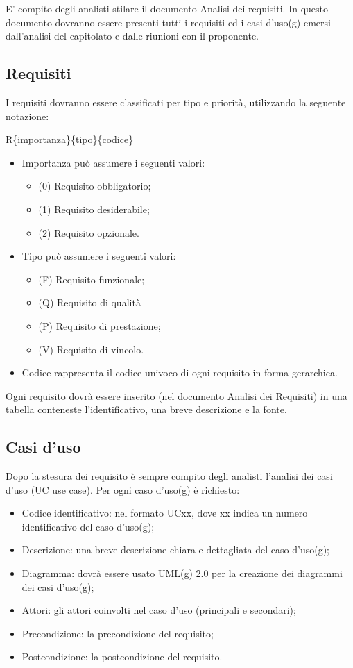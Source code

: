 E' compito degli analisti stilare il documento Analisi dei requisiti.
In questo documento dovranno essere presenti tutti i requisiti ed i casi d'uso(g) emersi dall'analisi del capitolato e dalle riunioni con il proponente.\\

\subsection{Requisiti}

I requisiti dovranno essere classificati per tipo e priorità, utilizzando la seguente notazione:

R\{importanza\}\{tipo\}\{codice\}
\begin{itemize}
  \item Importanza può assumere i seguenti valori:
\begin{itemize}
	\item (0) Requisito obbligatorio;
	\item (1) Requisito desiderabile;
	\item (2) Requisito opzionale.
\end{itemize}
  \item Tipo può assumere i seguenti valori:
\begin{itemize}
	\item (F) Requisito funzionale;
	\item (Q) Requisito di qualità
	\item (P) Requisito di prestazione;
	\item (V) Requisito di vincolo.
\end{itemize}
  \item Codice rappresenta il codice univoco di ogni requisito in forma gerarchica.
\end{itemize}
Ogni requisito dovrà essere inserito (nel documento Analisi dei Requisiti) in una tabella conteneste l'identificativo, una breve descrizione e la fonte.

\subsection{Casi d'uso}

Dopo la stesura dei requisito è sempre compito degli analisti l'analisi dei casi d'uso (UC use case).
Per ogni caso d'uso(g) è richiesto:
\begin{itemize}
	\item Codice identificativo: nel formato UCxx, dove xx indica un numero identificativo del caso d'uso(g);
	\item Descrizione: una breve descrizione chiara e dettagliata del caso d'uso(g);
	\item Diagramma: dovrà essere usato UML(g) 2.0 per la creazione dei diagrammi dei casi d'uso(g);
	\item Attori: gli attori coinvolti nel caso d'uso (principali e secondari);
	\item Precondizione: la precondizione del requisito;
	\item Postcondizione: la postcondizione del requisito.
\end{itemize}